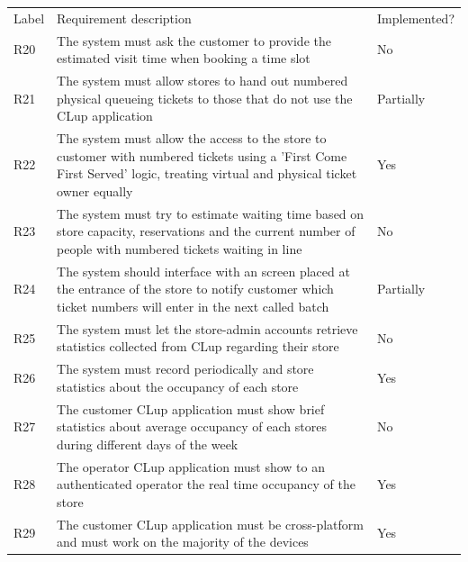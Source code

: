 \begin{tabular}{C{1cm}L{11cm}C{3.1cm}}
    Label & Requirement description & Implemented?                                                                                                                                                          \\
    R20   & The system  must ask the customer to provide the estimated visit time when booking a time slot   & No                                                                               \\
    R21   & The system must allow stores to hand out numbered physical queueing tickets to those that do not use the CLup application & Partially                                                       \\
    R22   & The system must allow the access to the store to customer with numbered tickets using a 'First Come First Served' logic, treating virtual and physical ticket owner equally  & Yes   \\
    R23   & The system must try to estimate waiting time based on store capacity, reservations and the current number of people with numbered tickets waiting in line  & No                      \\
    R24   & The system should interface with an screen placed at the entrance of the store to notify customer which ticket numbers will enter in the next called batch  & Partially                    \\
    R25   & The system must let the store-admin accounts retrieve statistics collected from CLup regarding their store & No                                                                      \\
    R26   & The system must record periodically and store statistics about the occupancy of each store & Yes                                                                                     \\
    R27   & The customer CLup application must show brief statistics about average occupancy of each stores during different days of the week  & No                                             \\
    R28   & The operator CLup application must show to an authenticated operator the real time occupancy of the store & Yes                                                                      \\
    R29   & The customer CLup application must be cross-platform and must work on the majority of the devices & Yes                                                                               \\

\end{tabular}
